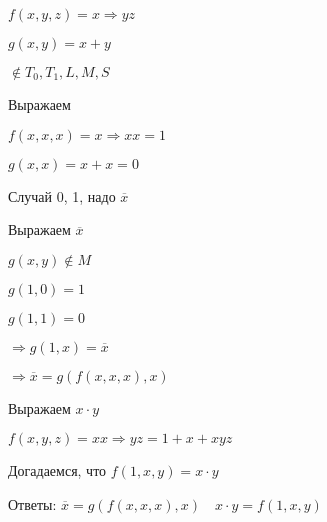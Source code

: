\documentclass[russian]{lecture-notes}
\begin{document}
\begin{example}
	$f(x, y, z) = x \Rightarrow yz$
	
	
	$g(x, y) = x + y$
	
	$\notin T_0, T_1, L, M, S$
	
	Выражаем
	
	$f(x, x, x) = x \Rightarrow xx = 1$
	
	$g(x, x) = x + x = 0$
	
	Случай 0, 1, надо $\overline{x}$
	
	Выражаем $\overline{x}$
	
	$g(x, y) \notin M$
	
	$g(1, 0) = 1$
	
	$g(1, 1) = 0$
	
	$\Rightarrow g(1, x) = \overline{x}$
	
	$\Rightarrow \overline{x} = g(f(x, x, x), x)$
	
	Выражаем $x \cdot y$
	
	$f(x, y, z) = xx \Rightarrow yz = 1 + x + xyz$
	
	Догадаемся, что $f(1, x, y) = x \cdot y$
	
	Ответы: $\overline{x} = g(f(x, x, x), x) \quad x \cdot y = f(1, x, y)$
\end{example}
\end{document}
